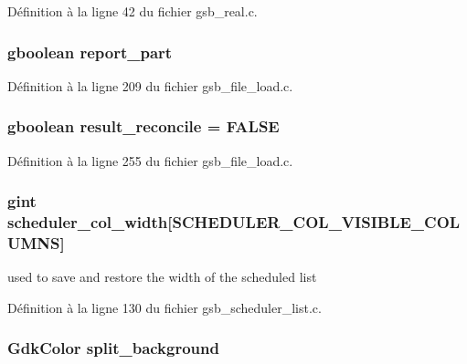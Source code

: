 Définition à la ligne 42 du fichier gsb\_\-real.c.

\subsubsection[{report\_\-part}]{\setlength{\rightskip}{0pt plus 5cm}gboolean {\bf report\_\-part}}\label{gsb__file__load_8c_abb7c9a52142faa6ab5fd6c514f834058}


Définition à la ligne 209 du fichier gsb\_\-file\_\-load.c.

\subsubsection[{result\_\-reconcile}]{\setlength{\rightskip}{0pt plus 5cm}gboolean {\bf result\_\-reconcile} = FALSE}\label{gsb__file__load_8c_ac165dc8e950fecfeea085204f948425e}


Définition à la ligne 255 du fichier gsb\_\-file\_\-load.c.

\subsubsection[{scheduler\_\-col\_\-width}]{\setlength{\rightskip}{0pt plus 5cm}gint {\bf scheduler\_\-col\_\-width}[SCHEDULER\_\-COL\_\-VISIBLE\_\-COLUMNS]}\label{gsb__file__load_8c_a8278ca506ea616623cd8cdc764188ee9}
used to save and restore the width of the scheduled list 

Définition à la ligne 130 du fichier gsb\_\-scheduler\_\-list.c.

\subsubsection[{split\_\-background}]{\setlength{\rightskip}{0pt plus 5cm}GdkColor {\bf split\_\-background}}\label{gsb__file__load_8c_abc4f631d953e2be68189a6fbcf55cd1d}


